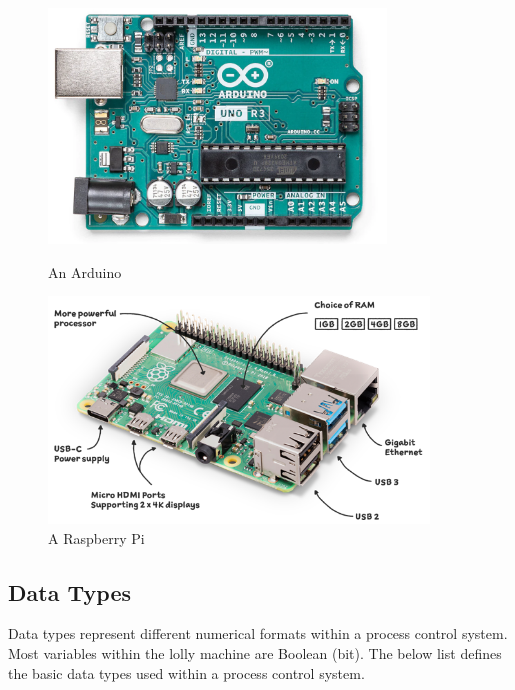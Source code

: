     \begin{figure}[H]
    \centering
    \begin{minipage}{0.4\textwidth}
        \centering
        \includegraphics[width = 0.8\textwidth]{2_images/arduino.png}
        \caption{An Arduino~\cite{arduinoWeb}}
        \label{fig:arduino}
    \end{minipage}\hfill
    \begin{minipage}{0.4\textwidth}
        \centering
        \includegraphics[width = 0.9\textwidth]{2_images/RaspPi.png}
        \caption{A Raspberry Pi~\cite{raspPiWeb}}
        \label{fig:raspPi}
    \end{minipage}\hfill            
    \end{figure}     

\subsection{Data Types}
    Data types represent different numerical formats within a process control system. Most variables within the lolly machine are Boolean (bit). The below list defines the basic data types used within a process control system. 
    
